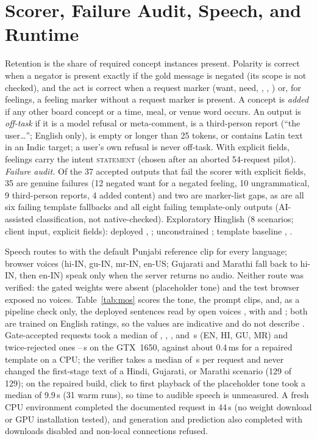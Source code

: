 \section{Scorer, Failure Audit, Speech, and Runtime}
\label{app:scorer}\label{app:coverage}
Retention is the share of required concept instances present. Polarity is correct when a negator is present exactly if the gold message is negated (its scope is not checked), and the act is correct when a request marker (want, need, , , ) or, for feelings, a feeling marker without a request marker is present. A concept is \emph{added} if any other board concept or a time, meal, or venue word occurs.
An output is \emph{off-task} if it is a model refusal or meta-comment, is a third-person report (``the user\ldots''; English only), is empty or longer than 25 tokens, or contains Latin text in an Indic target; a user's own refusal is never off-task. With explicit fields, feelings carry the intent \textsc{statement} (chosen after an aborted 54-request pilot).
\emph{Failure audit.} Of the 37 accepted outputs that fail the scorer with explicit fields, 35 are genuine failures (12 negated want for a negated feeling, 10 ungrammatical, 9 third-person reports, 4 added content) and two are marker-list gaps, as are all six failing template fallbacks and all eight failing template-only outputs (AI-assisted classification, not native-checked).
Exploratory Hinglish (8 scenarios; client input, explicit fields): deployed \CMSuccDepU{}, \CMSuccDepS{}; unconstrained \CMSuccNaive{}; template baseline \CMSuccTmplU{}, \CMSuccTmplS{}.


Speech routes to \indicf{} with the default Punjabi reference clip for every language; browser voices (hi-IN, gu-IN, mr-IN, en-US; Gujarati and Marathi fall back to hi-IN, then en-IN) speak only when the server returns no audio. Neither route was verified: the gated weights were absent (placeholder tone) and the test browser exposed no voices. Table~\ref{tab:mos} scores the tone, the prompt clips, and, as a pipeline check only, the deployed sentences read by open \mmstts{} voices \citep{pratap2023mms}, with \utmos{} \citep{saeki2022utmos} and \nisqa{} \citep{mittag2021nisqa}; both are trained on English ratings, so the values are indicative and do not describe \indicf{}.
Gate-accepted requests took a median of \LatMedAccEN{}, \LatMedAccHI{}, \LatMedAccGU{}, and \LatMedAccMR{}\,s (EN, HI, GU, MR) and twice-rejected ones \LatFbMin{}--\LatFbMax{}\,s on the GTX~1650, against about 0.4\,ms for a repaired template on a CPU; the verifier takes a median of \StageLlmThree{}\,s per request and never changed the first-stage text of a Hindi, Gujarati, or Marathi scenario (129 of 129); on the repaired build, click to first playback of the placeholder tone took a median of 9.9\,s (31 warm runs), so time to audible speech is unmeasured.
A fresh CPU environment completed the documented request in 44\,s (no weight download or GPU installation tested), and generation and prediction also completed with downloads disabled and non-local connections refused.

